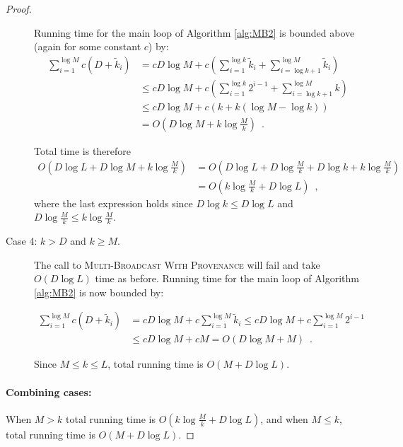 \documentclass{article}
\begin{document}
\begin{proof}
\begin{description}
		Running time for the main loop of Algorithm \ref{alg:MB2} is bounded above (again for some constant $c$) by:
\begin{align*}
		\sum_{i=1}^{\log M} c (D + \tilde{k}_i)
		& =
		c D \log M + c \left(\sum_{i=1}^{\log k} \tilde{k}_i + \sum_{i=\log k+1}^{\log M} \tilde{k}_i\right)
		\\
		&\le
		c D \log M + c \left(\sum_{i=1}^{\log k} 2^{i-1} + \sum_{i=\log k+1}^{\log M} k\right)
		\\
		& \le
		c D \log M + c(k + k(\log M - \log k))
		\\
		&=
		O(D \log M + k \log \frac{M}{k})
		\enspace.
		\end{align*}
		
		Total time is therefore
\begin{align*}
		O(D \log L + D \log M + k \log \frac{M}{k})
		&=
		O(D \log L + D \log \frac{M}{k} + D \log k + k \log \frac{M}{k})
		\\
		&=
		O(k \log \frac{M}{k} + D \log L)
		\enspace,
		\end{align*}
where the last expression holds since $D \log k \le D \log L$ and $D \log \frac Mk \le k \log \frac Mk$.
		
		\item[Case 4: $k>D$ and $k \ge M$.]
		
		The call to \textsc{Multi-Broadcast With Provenance} will fail and take $O(D \log L)$ time as before. Running time for the main loop of Algorithm \ref{alg:MB2} is now bounded by:
		
		\begin{align*}
		\sum_{i=1}^{\log M} c (D + \tilde{k}_i)
		& =
		c D \log M + c \sum_{i=1}^{\log M} \tilde{k}_i
		\le
		c D \log M + c \sum_{i=1}^{\log M} 2^{i-1}\\
		&\le
		cD \log M + cM
		=
		O(D \log M + M)
		\enspace.
		\end{align*}
		
		Since $M\le k\le L$, total running time is $O(M + D \log L)$.
	\end{description}
	
	\paragraph*{Combining cases:}
	
	When $M>k$ total running time is $O(k\log\frac Mk + D \log L)$, and when $M\le k$, total running time is $O(M + D \log L)$.
\end{proof}
\end{document}

